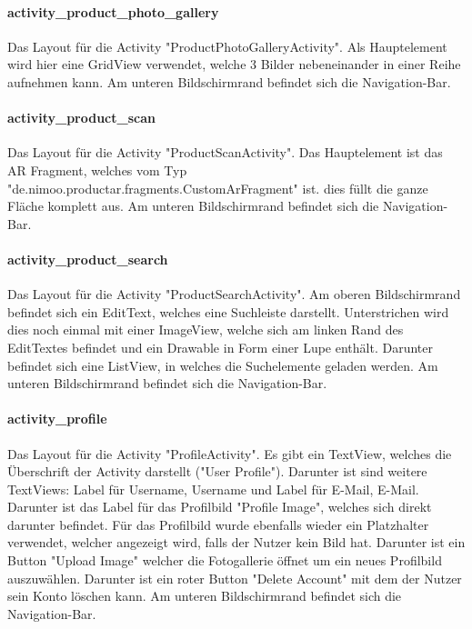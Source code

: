 \documentclass{scrartcl}
\begin{document}
\paragraph{activity\_product\_photo\_gallery} \mbox{} 

\noindent Das Layout für die Activity "ProductPhotoGalleryActivity". Als Hauptelement wird hier eine GridView verwendet, welche 3 Bilder nebeneinander in einer Reihe aufnehmen kann. Am unteren Bildschirmrand befindet sich die Navigation-Bar.

\paragraph{activity\_product\_scan} \mbox{} 

\noindent Das Layout für die Activity "ProductScanActivity". Das Hauptelement ist das AR Fragment, welches vom Typ "de.nimoo.productar.fragments.CustomArFragment" ist. dies füllt die ganze Fläche komplett aus. Am unteren Bildschirmrand befindet sich die Navigation-Bar.

\paragraph{activity\_product\_search} \mbox{} 

\noindent Das Layout für die Activity "ProductSearchActivity". Am oberen Bildschirmrand befindet sich ein EditText, welches eine Suchleiste darstellt. Unterstrichen wird dies noch einmal mit einer ImageView, welche sich am linken Rand des EditTextes befindet und ein Drawable in Form einer Lupe enthält. Darunter befindet sich eine ListView, in welches die Suchelemente geladen werden. Am unteren Bildschirmrand befindet sich die Navigation-Bar.

\paragraph{activity\_profile} \mbox{} 

\noindent Das Layout für die Activity "ProfileActivity". Es gibt ein TextView, welches die Überschrift der Activity darstellt ("User Profile"). Darunter ist sind weitere TextViews: Label für Username, Username und Label für E-Mail, E-Mail. Darunter ist das Label für das Profilbild "Profile Image", welches sich direkt darunter befindet. Für das Profilbild wurde ebenfalls wieder ein Platzhalter verwendet, welcher angezeigt wird, falls der Nutzer kein Bild hat. Darunter ist ein Button "Upload Image" welcher die Fotogallerie öffnet um ein neues Profilbild auszuwählen. Darunter ist ein roter Button "Delete Account" mit dem der Nutzer sein Konto löschen kann. Am unteren Bildschirmrand befindet sich die Navigation-Bar.
\end{document}
